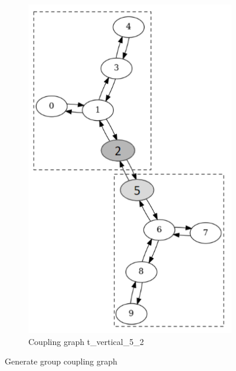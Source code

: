 \begin{figure}[!htb]
\begin{subfigure}{0.3\linewidth}
        \includegraphics[width=\linewidth]{image/coupling_graph_t_vertical.png}
        \caption{Coupling graph t\_vertical\_5\_2}
        \label{fig:coupling-graph-t-vertical}
    \end{subfigure}
    \caption{Generate group coupling graph}
\end{figure}